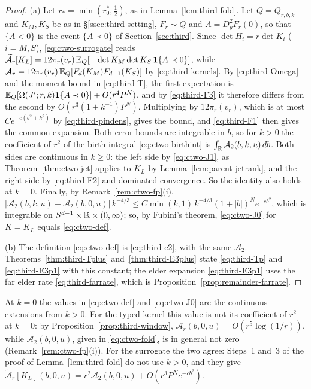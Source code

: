 \begin{proof}
(a) Let $r_*=\min(r_0^*,\frac12)$, as in Lemma~\ref{lem:third-fold}. Let $Q=Q_{r,b,k}$ and $K_M,K_S$ be as in \S\ref{ssec:third-setting}, $F_r\sim Q$ and $A=D_y^2F_r(0)$, so that $\{A<0\}$ is the event $\{A\prec0\}$ of Section~\ref{sec:third}. Since $\det H_i=r\det K_i$ ($i=M,S$), \eqref{eq:ctwo-surrogate} reads $\widetilde{\mathcal A}_r[K_L]=12\pi_r(v_r)\,\mathbb E_Q[-\det K_M\det K_S\,\mathbf 1\{A\prec0\}]$, while $\mathcal A_r=12\pi_r(v_r)\,\mathbb E_Q[F_d(K_M)F_{d-1}(K_S)]$ by \eqref{eq:third-kernels}. By \eqref{eq:third-Omega} and the moment bound in \eqref{eq:third-T}, the first expectation is $\mathbb E_Q[\Omega(J';r,k)\mathbf 1\{A\prec0\}]+O(r^4P^N)$, and by \eqref{eq:third-F3} it therefore differs from the second by $O(r^3(1+k^{-1})P^N)$. Multiplying by $12\pi_r(v_r)$, which is at most $Ce^{-c(b^2+k^2)}$ by \eqref{eq:third-pindens}, gives the bound, and \eqref{eq:third-F1} then gives the common expansion. Both error bounds are integrable in $b$, so for $k>0$ the coefficient of $r^2$ of the birth integral \eqref{eq:ctwo-birthint} is $\int_\mathbb R\mathcal A_2(b,k,u)\,db$. Both sides are continuous in $k\ge0$: the left side by \eqref{eq:ctwo-J1}, as Theorem~\ref{thm:ctwo-jet} applies to $K_L$ by Lemma~\ref{lem:parent-jetrank}, and the right side by \eqref{eq:third-F2} and dominated convergence. So the identity also holds at $k=0$. Finally, by Remark~\ref{rem:ctwo-fp}(i), $|\mathcal A_2(b,k,u)-\mathcal A_2(b,0,u)|\,k^{-4/3}\le C\min(k,1)\,k^{-4/3}(1+|b|)^Ne^{-cb^2}$, which is integrable on $S^{d-1}\times\mathbb R\times(0,\infty)$; so, by Fubini's theorem, \eqref{eq:ctwo-J0} for $K=K_L$ equals \eqref{eq:ctwo-def}.

(b) The definition \eqref{eq:ctwo-def} is \eqref{eq:third-c2}, with the same $\mathcal A_2$. Theorems~\ref{thm:third-Tplus} and~\ref{thm:third-E3plus} state \eqref{eq:third-Tp} and \eqref{eq:third-E3p1} with this constant; the elder expansion \eqref{eq:third-E3p1} uses the far elder rate \eqref{eq:third-farrate}, which is Proposition~\ref{prop:remainder-farrate}.
\end{proof}

At $k=0$ the values in \eqref{eq:ctwo-def} and \eqref{eq:ctwo-J0} are the continuous extensions from $k>0$. For the typed kernel this value is not its coefficient of $r^2$ at $k=0$: by Proposition~\ref{prop:third-window}, $\mathcal A_r(b,0,u)=O(r^5\log(1/r))$, while $\mathcal A_2(b,0,u)$, given in \eqref{eq:ctwo-fold}, is in general not zero (Remark~\ref{rem:ctwo-fp}(i)). For the surrogate the two agree: Steps~1 and~3 of the proof of Lemma~\ref{lem:third-fold} do not use $k>0$, and they give $\widetilde{\mathcal A}_r[K_L](b,0,u)=r^2\mathcal A_2(b,0,u)+O(r^3P^Ne^{-cb^2})$.

